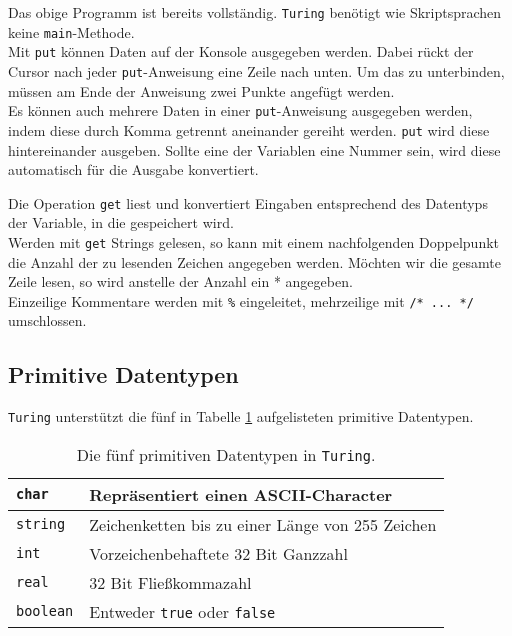 Das obige Programm ist bereits vollst\"andig. \texttt{Turing} ben\"otigt wie Skriptsprachen keine \texttt{main}-Methode. \\

Mit \lstinline{put} k\"onnen Daten auf der Konsole ausgegeben werden. Dabei r\"uckt der Cursor nach jeder \lstinline{put}-Anweisung eine Zeile nach unten. Um das zu unterbinden, m\"ussen am Ende der Anweisung zwei Punkte angef\"ugt werden. \\
Es k\"onnen auch mehrere Daten in einer \lstinline{put}-Anweisung ausgegeben werden, indem diese durch Komma getrennt aneinander gereiht werden. \lstinline{put} wird diese hintereinander ausgeben. Sollte eine der Variablen eine Nummer sein, wird diese automatisch f\"ur die Ausgabe konvertiert.

Die Operation \lstinline{get} liest und konvertiert Eingaben entsprechend des Datentyps der Variable, in die gespeichert wird. \\
Werden mit \lstinline{get} Strings gelesen, so kann mit einem nachfolgenden Doppelpunkt die Anzahl der zu lesenden Zeichen angegeben werden. M\"ochten wir die gesamte Zeile lesen, so wird anstelle der Anzahl ein * angegeben. \\

Einzeilige Kommentare werden mit \texttt{\%} eingeleitet, mehrzeilige mit \texttt{/* ... */} umschlossen.  

\subsection{Primitive Datentypen}

\texttt{Turing} unterst\"utzt die f\"unf in Tabelle \ref{tab:datatypes} aufgelisteten primitive Datentypen.

\begin{table}[h!]
\begin{center}
  \begin{tabular}{|l|l|}
  \hline
  \texttt{char}    & Repr\"asentiert einen ASCII-Character \\
  \hline
  \texttt{string}  & Zeichenketten bis zu einer L\"ange von 255 Zeichen \\
  \hline
  \texttt{int}     & Vorzeichenbehaftete 32 Bit Ganzzahl  \\
  \hline
  \texttt{real}    & 32 Bit Flie\ss{}kommazahl \\
  \hline
  \texttt{boolean} & Entweder \texttt{true} oder \texttt{false} \\
  \hline
  \end{tabular}
\label{tab:datatypes}
\caption{Die f\"unf primitiven Datentypen in \texttt{Turing}.}
\end{center}
\end{table}

